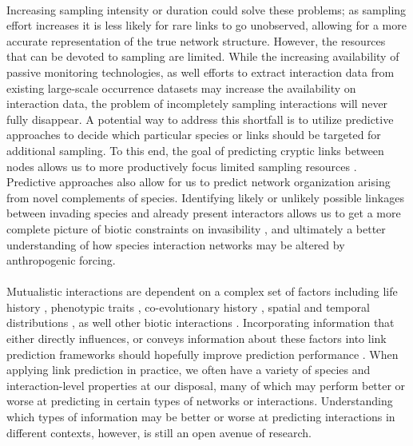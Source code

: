 \documentclass[num-refs]{article}%
\begin{document}
\paragraph*{}
Increasing sampling intensity or duration could solve these problems; as sampling effort increases it is less likely for rare links to go unobserved, allowing for a more accurate representation of the true network structure. However, the resources that can be devoted to sampling are limited. While the increasing availability of passive monitoring technologies\citep{quintero2022methodological}, as well efforts to extract interaction data from existing large-scale occurrence datasets \citep{putman2021power} may increase the availability on interaction data, the problem of incompletely sampling interactions will never fully disappear. A potential way to address this shortfall is to utilize predictive approaches to decide which particular species or links should be targeted for additional sampling. To this end, the goal of predicting cryptic links between nodes allows us to more productively focus limited sampling resources \citep{terry2020finding}. Predictive approaches also allow for us to predict network organization arising from novel complements of species. Identifying likely or unlikely possible linkages between invading species and already present interactors allows us to get a more complete picture of biotic constraints on invasibility \citep{minoarivelo2016invading}, and ultimately a better understanding of how species interaction networks may be altered by anthropogenic forcing.  

\paragraph*{}
Mutualistic interactions are dependent on a complex set of factors including life history \citep{ramos2018fruit}, phenotypic traits \citep{rafferty2013}, co-evolutionary history \citep{eriksson2016evolution}, spatial and temporal distributions \citep{menke2012plant, fricke2020accelerating, laurindo2020drivers}, as well other biotic interactions \citep{carreira2020question}. Incorporating information that either directly influences, or conveys information about these factors into link prediction frameworks should hopefully improve prediction performance \citep{dallas2017predicting}. When applying link prediction in practice, we often have a variety of species and interaction-level properties at our disposal, many of which may perform better or worse at predicting in certain types of networks or interactions. Understanding which types of information may be better or worse at predicting interactions in different contexts, however, is still an open avenue of research. 
\end{document}
